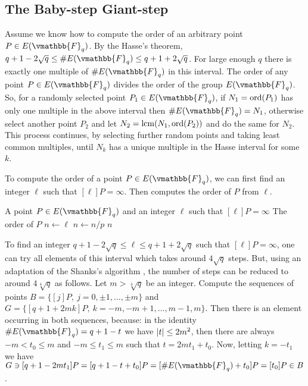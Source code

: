 \subsection{The Baby-step Giant-step}

Assume we know how to compute the order of an arbitrary point $P \in E(\vmathbb{F}_q)$. By the 
Hasse's theorem, $q + 1 -2\sqrt{q} \le \#E(\vmathbb{F}_q) \le q + 1 + 2\sqrt{q}$. For large enough 
$q$ there is exactly one multiple of $\#E(\vmathbb{F}_q)$ in this interval. The order of any point $P 
\in E(\vmathbb{F}_q)$ divides the order of the group $E(\vmathbb{F}_q)$. So, for a randomly selected 
point $P_1 \in E(\vmathbb{F}_q)$, if $N_1 = \operatorname{ord}(P_1)$ has only one multiple in the above interval 
then $\#E(\vmathbb{F}_q) = N_1$, otherwise select another point $P_2$ and let $N_2 = \operatorname{lcm}(N_1, 
\operatorname{ord}(P_2))$ and do the same for $N_2$. This process continues, by selecting further random points 
and taking least common multiples, until $N_k$ has a unique multiple in the Hasse interval for some 
$k$.

To compute the order of a point $P \in E(\vmathbb{F}_q)$, we can first find an integer $\ell$ such 
that $[\ell] P = \infty$. Then  computes the order of $P$ from 
$\ell$.

\begin{algorithm}
\label{algorithm:elem-ord-ann}
\begin{algorithmic}[1]
\REQUIRE A point $P \in E(\vmathbb{F}_q)$ and an integer $\ell$ such that $[\ell] P = \infty$
\ENSURE  The order of $P$
\STATE $n \leftarrow \ell$
		\STATE $n \leftarrow n / p$
	\ENDWHILE
\ENDFOR
\RETURN $n$
\end{algorithmic}
\end{algorithm}

To find an integer $q + 1 -2\sqrt{q} \le \ell \le q + 1 + 2\sqrt{q}$ such that $[\ell] P = \infty$, 
one can try all elements of this interval which takes around $4\sqrt{q}$ steps. But, using an 
adaptation of the Shanks's algorithm \cite{Shank1971}, the number of steps can be reduced to around 
$4\sqrt[4]{q}$ as follows. Let $m > \sqrt[4]{q}$ be an integer. Compute the sequences of points $B = 
\{ [j]P, \: j = 0, \pm 1, \dots, \pm m \}$ and $G = \{[q + 1 + 2mk]P, \: k = -m, -m + 1, \dots, m - 
1, m\}$. Then there is an element occurring in both sequences, because: in the identity 
$\#E(\vmathbb{F}_q) = q + 1 - t$ we have $\left\vert t\right\vert \le 2m^2$, then there are always $-m < t_0 \le m$ 
and $-m \le t_1 \le m$ such that $t = 2mt_1 + t_0$. Now, letting $k = -t_1$ we have $G \ni [q + 1 
-2mt_1]P = [q + 1 - t + t_0]P = [\#E(\vmathbb{F}_q) + t_0]P = [t_0]P \in B$.

